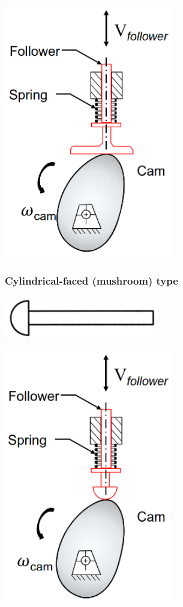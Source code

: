 \documentclass[11pt]{article}
\begin{document}
\begin{center}
\includegraphics[height=30em]{./images/flat-faced-follower-and-cam.png}
\end{center}
\subsubsection{Cylindrical-faced (mushroom) type}
\label{sec:org956ba97}
\begin{center}
\includegraphics[width=.9\linewidth]{./images/cylindrical-faced-follower.png}
\end{center}

\begin{center}
\includegraphics[height=30em]{./images/cylindrical-follower-and-cam.png}
\end{center}
\end{document}
